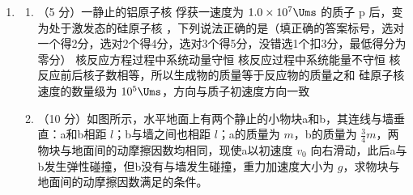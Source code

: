 \documentclass[\gkver]{gaokaozhenti}
\begin{document}
\begin{enumerate}
\item
\begin{enumerate}
	\item
	（5 分）一静止的铝原子核  俘获一速度为 $1.0\times10^{7}\Ums$ 的质子 p 后，变为处于激发态的硅原子核 ，下列说法正确的是（填正确的答案标号，选对一个得2分，选对2个得4分，选对3个得5分，没错选1个扣3分，最低得分为零分）
	{核反应方程过程中系统动量守恒}
	{核反应过程中系统能量不守恒}
	{核反应前后核子数相等，所以生成物的质量等于反应物的质量之和}
	{硅原子核速度的数量级为 $10^{5}\Ums$，方向与质子初速度方向一致}
	\item
	（10 分）如图所示，水平地面上有两个静止的小物块a和b，其连线与墙垂直：a和b相距 $l$；b与墙之间也相距 $l$；a的质量为 $m$，b的质量为 $\frac{3}{4}m$，两物块与地面间的动摩擦因数均相同，现使a以初速度 $v_{0}$ 向右滑动，此后a与b发生弹性碰撞，但b没有与墙发生碰撞，重力加速度大小为 $g$，求物块与地面间的动摩擦因数满足的条件。
\end{enumerate}


\end{enumerate}
\end{document}
